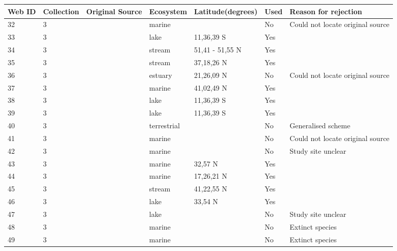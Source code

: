 \documentclass[12pt]{article}
\begin{document}
\begin{landscape}
    \begin{table}[h!]
    \centering
    {\footnotesize
      \begin{tabular}{p{2.8cm}p{1.3cm}p{5.5cm}p{2.2cm}p{2.5cm}lp{3.5cm}}
        \hline
        Web ID & Collection & Original Source & Ecosystem & Latitude(degrees) & Used  & Reason for rejection  \\
        \hline
        32    & 3 & \cite{Petipa1970}  & marine &       & No    & Could not locate original source \\
        33    & 3 & \cite{Fryer1959} & lake & 11,36,39 S & Yes   &       \\
        34    & 3 & \cite{Jones1949}     & stream & 51,41 - 51,55 N & Yes   &       \\
        35    & 3 & \cite{Minshall1967}    & stream & 37,18,26 N & Yes   &       \\
        36    & 3 & \cite{Walsh1967}  & estuary & 21,26,09 N & No    & Could not locate original source \\
        37    & 3 & \cite{Clarke1967}    & marine & 41,02,49 N & Yes   &       \\
        38    & 3 & \cite{Fryer1959} & lake & 11,36,39 S & Yes   &       \\
        39    & 3 & \cite{Fryer1959} & lake & 11,36,39 S & Yes   &       \\
        40    & 3 & \cite{Harrison1962}  & terrestrial &       & No    & Generalised scheme \\
        41    & 3 & \cite{Parin1970}  & marine &       & No    & Could not locate original source \\
        42    & 3 & \cite{Vinogradov1978}  & marine &       & No    & Study site unclear \\
        43    & 3 & \cite{Rosenthal1974}    & marine & 32,57 N & Yes   &       \\
        44    & 3 & \cite{Yanez1978}  & marine & 17,26,21 N & Yes   &       \\
        45    & 3 & \cite{Tilly1968}    & stream & 41,22,55 N & Yes   &       \\
        46    & 3 & \cite{Patten1975}    & lake & 33,54 N & Yes   &       \\
        47    & 3 & \cite{Harris1980}    & lake &       & No    & Study site unclear \\
        48    & 3 & \cite{Simenstad1978}    & marine &       & No    & Extinct species \\
        49    & 3 & \cite{Simenstad1978}    & marine &       & No    & Extinct species \\

\end{tabular}}
\end{table}
\end{landscape}
\end{document}
